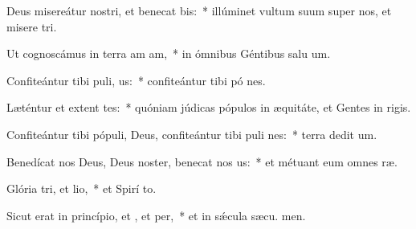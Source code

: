 \item Deus misereátur nostri, et benecat bis:~* illúminet vultum suum super nos, et misere tri.
\item Ut cognoscámus in terra am am,~* in ómnibus Géntibus salu um.
\item Confiteántur tibi puli, us:~* confiteántur tibi pó nes.
\item Læténtur et extent tes:~* quóniam júdicas pópulos in æquitáte, et Gentes in  rigis.
\item Confiteántur tibi pópuli, Deus, confiteántur tibi puli nes:~* terra dedit  um.
\item Benedícat nos Deus, Deus noster, benecat nos us:~* et métuant eum omnes  ræ.
\item Glória tri, et lio,~* et Spirí to.
\item Sicut erat in princípio, et , et per,~* et in sǽcula sæcu. men.
